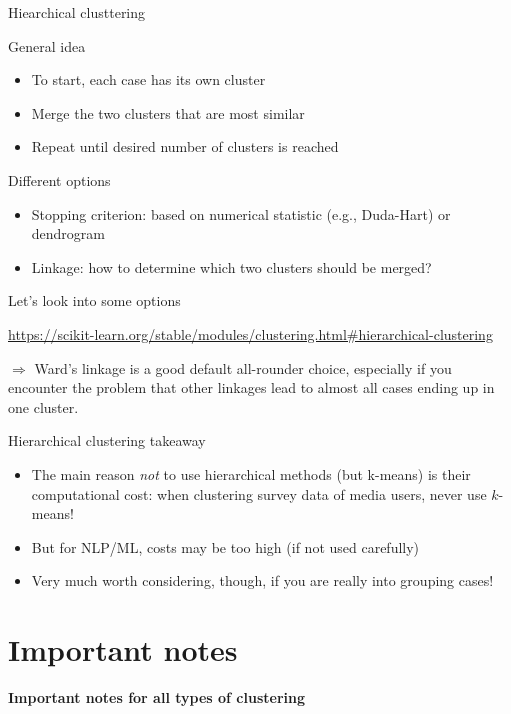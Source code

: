\documentclass{beamer}
\begin{document}
\begin{frame}{Hiearchical clusttering}
\begin{block}{General idea}
	\begin{itemize}
		\item To start, each case has its own cluster
		\item Merge the two clusters that are most similar
		\item Repeat until desired number of clusters is reached
	\end{itemize}

\end{block}

\pause

\begin{block}{Different options}
\begin{itemize}
	\item Stopping criterion: based on numerical statistic (e.g., Duda-Hart) or dendrogram
	\item Linkage: how to determine which two clusters should be merged?
\end{itemize}

\end{block}
\end{frame}


\begin{frame}{Let's look into some options}

\url{https://scikit-learn.org/stable/modules/clustering.html\#hierarchical-clustering}

$\Rightarrow$ Ward's linkage is a good default all-rounder choice, especially if you encounter the problem that other linkages lead to almost all cases ending up in one cluster. 
\end{frame}


\begin{frame}{Hierarchical clustering takeaway}
\begin{itemize}
	\item The main reason \emph{not} to use hierarchical methods (but k-means) is their computational cost: when clustering survey data of media users, never use $k$-means!
	\item But for NLP/ML, costs may be too high (if not used carefully)
	\item Very much worth considering, though, if you are really into grouping cases!
\end{itemize}
\end{frame}


\section{Important notes}
\begin{frame}[plain]
\textbf{Important notes for all types of clustering}
\end{frame}
\end{document}
